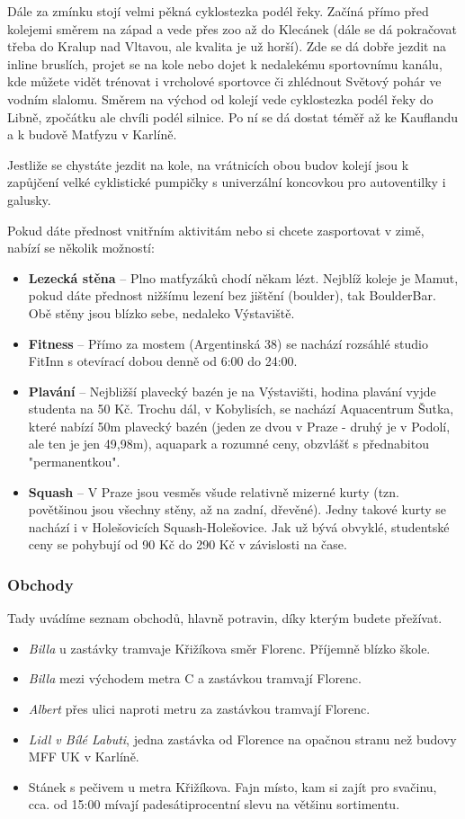 Dále za zmínku stojí velmi pěkná cyklostezka podél řeky. Začíná přímo před
kolejemi směrem na západ a vede přes zoo až do Klecánek (dále se dá pokračovat
třeba do Kralup nad Vltavou, ale kvalita je už horší). Zde se dá dobře jezdit na
inline bruslích, projet se na kole nebo dojet k nedalekému sportovnímu kanálu,
kde můžete vidět trénovat i vrcholové sportovce či zhlédnout Světový pohár ve
vodním slalomu. Směrem na východ od kolejí vede cyklostezka podél řeky do Libně,
zpočátku ale chvíli podél silnice. Po ní se dá dostat téměř až ke Kauflandu a k
budově Matfyzu v Karlíně.

Jestliže se chystáte jezdit na kole, na vrátnicích obou budov kolejí jsou k
zapůjčení velké cyklistické pumpičky s univerzální koncovkou pro autoventilky i
galusky.

Pokud dáte přednost vnitřním aktivitám nebo si chcete zasportovat v zimě, nabízí
se několik možností:
\begin{itemize}
\item \textbf{Lezecká stěna} – Plno matfyzáků chodí někam lézt. Nejblíž koleje
je Mamut, pokud dáte přednost nižšímu lezení bez jištění (boulder), tak
BoulderBar. Obě stěny jsou blízko sebe, nedaleko Výstaviště.
\item \textbf{Fitness} – Přímo za mostem (Argentinská 38) se nachází rozsáhlé
studio FitInn s otevírací dobou denně od 6:00 do 24:00. 
\item \textbf{Plavání} – Nejbližší plavecký bazén je na Výstavišti, hodina
plavání vyjde studenta na 50 Kč. Trochu dál, v Kobylisích, se nachází
Aquacentrum Šutka, které nabízí 50m plavecký bazén (jeden ze dvou v Praze -
druhý je v Podolí, ale ten je jen 49,98m), aquapark a rozumné ceny, obzvlášť s
přednabitou "permanentkou".
\item \textbf{Squash} – V Praze jsou vesměs všude relativně mizerné kurty (tzn.
povětšinou jsou všechny stěny, až na zadní, dřevěné). Jedny takové kurty se
nachází i v Holešovicích Squash-Holešovice. Jak už bývá obvyklé, studentské ceny
se pohybují od 90 Kč do 290 Kč v závislosti na čase.
\end{itemize}


\subsubsection{Obchody}
Tady uvádíme seznam obchodů, hlavně potravin, díky kterým budete přežívat.

\begin{itemize}
\item \textit{Billa} u zastávky tramvaje Křižíkova směr Florenc. Příjemně blízko
škole.
\item \textit{Billa} mezi východem metra C a zastávkou tramvají Florenc.
\item \textit{Albert} přes ulici naproti metru za zastávkou tramvají Florenc.
\item \textit{Lidl v Bílé Labuti}, jedna zastávka od Florence na opačnou stranu
než budovy MFF UK v Karlíně.
\item Stánek s pečivem u metra Křižíkova. Fajn místo, kam si zajít pro svačinu,
cca. od 15:00 mívají padesátiprocentní slevu na většinu sortimentu.
\end{itemize}

